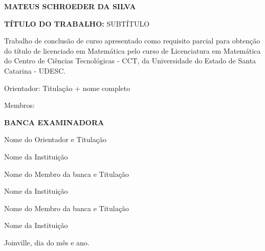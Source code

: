 \documentclass[
	12pt,				%
	oneside,			%
	a4paper,			%
	english,			%
	french,				%
	spanish,			%
	brazil,				%
	]{abntex2}
\theoremstyle{plain}
\theoremstyle{definition}
\begin{document}

%
% 


\begin{folhadeaprovacao}

  \begin{center}
    \textbf{MATEUS SCHROEDER DA SILVA}
\vspace {1 cm}

     \textbf{TÍTULO DO TRABALHO:} SUBTÍTULO
   \vspace {1 cm}
  \end{center}
    
\begin{flushright}
  \begin{minipage}[t]{8 cm}
  { Trabalho de conclusão de curso apresentado como requisito parcial para obtenção do título de licenciado em Matemática pelo curso de Licenciatura em Matemática do Centro de Ciências Tecnológicas - CCT, da Universidade do Estado de Santa Catarina - UDESC. 

 Orientador: Titulação + nome completo}
 
  \end{minipage}
  \end{flushright}
     
     \begin{minipage}[c]{3cm} 
	Membros:
\end{minipage}
\begin{minipage}[c]{8 cm}
	\begin{center}
	\textbf{BANCA EXAMINADORA}
	\vspace {2 cm}
	
	Nome do Orientador e Titulação
	
    Nome da Instituição
    
    \vspace {1.5 cm}
    
    Nome do Membro da banca e Titulação
	
    Nome da Instituição
    
    \vspace {1.5 cm}
    
    Nome do Membro da banca e Titulação
	
    Nome da Instituição
    \vspace {1.5 cm}
    
    
\end{center}

\end{minipage}

\vspace*{\fill}
     \begin{center}
	     Joinville, dia do mês e ano.
\end{center}

    
\end{folhadeaprovacao}
\end{document}
